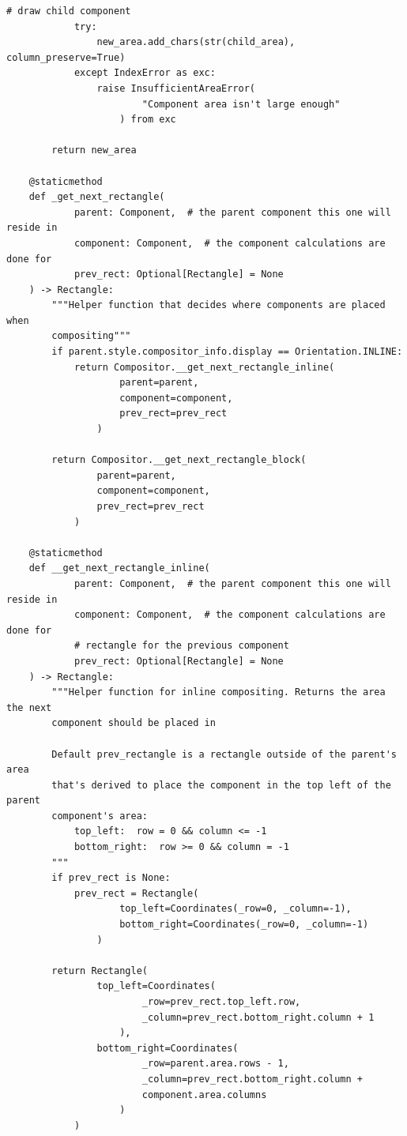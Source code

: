 \begin{lstlisting}[style=py]
            # draw child component
            try:
                new_area.add_chars(str(child_area), column_preserve=True)
            except IndexError as exc:
                raise InsufficientAreaError(
                        "Component area isn't large enough"
                    ) from exc

        return new_area

    @staticmethod
    def _get_next_rectangle(
            parent: Component,  # the parent component this one will reside in
            component: Component,  # the component calculations are done for
            prev_rect: Optional[Rectangle] = None
    ) -> Rectangle:
        """Helper function that decides where components are placed when
        compositing"""
        if parent.style.compositor_info.display == Orientation.INLINE:
            return Compositor.__get_next_rectangle_inline(
                    parent=parent,
                    component=component,
                    prev_rect=prev_rect
                )

        return Compositor.__get_next_rectangle_block(
                parent=parent,
                component=component,
                prev_rect=prev_rect
            )

    @staticmethod
    def __get_next_rectangle_inline(
            parent: Component,  # the parent component this one will reside in
            component: Component,  # the component calculations are done for
            # rectangle for the previous component
            prev_rect: Optional[Rectangle] = None
    ) -> Rectangle:
        """Helper function for inline compositing. Returns the area the next
        component should be placed in

        Default prev_rectangle is a rectangle outside of the parent's area
        that's derived to place the component in the top left of the parent
        component's area:
            top_left:  row = 0 && column <= -1
            bottom_right:  row >= 0 && column = -1
        """
        if prev_rect is None:
            prev_rect = Rectangle(
                    top_left=Coordinates(_row=0, _column=-1),
                    bottom_right=Coordinates(_row=0, _column=-1)
                )

        return Rectangle(
                top_left=Coordinates(
                        _row=prev_rect.top_left.row,
                        _column=prev_rect.bottom_right.column + 1
                    ),
                bottom_right=Coordinates(
                        _row=parent.area.rows - 1,
                        _column=prev_rect.bottom_right.column +
                        component.area.columns
                    )
            )


\end{lstlisting}
